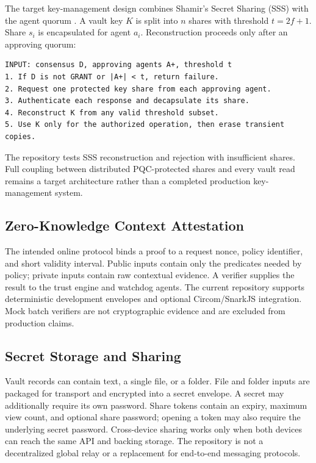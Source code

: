 \documentclass[10pt]{article}
\let\cite\citep
\begin{document}
The target key-management design combines Shamir's Secret Sharing (SSS) with the agent quorum \cite{shamir1979}. A vault key $K$ is split into $n$ shares with threshold $t=2f+1$. Share $s_i$ is encapsulated for agent $a_i$. Reconstruction proceeds only after an approving quorum:

\begin{lstlisting}[caption={Consensus-gated key reconstruction},label={alg:keyrec}]
INPUT: consensus D, approving agents A+, threshold t
1. If D is not GRANT or |A+| < t, return failure.
2. Request one protected key share from each approving agent.
3. Authenticate each response and decapsulate its share.
4. Reconstruct K from any valid threshold subset.
5. Use K only for the authorized operation, then erase transient copies.
\end{lstlisting}

The repository tests SSS reconstruction and rejection with insufficient shares. Full coupling between distributed PQC-protected shares and every vault read remains a target architecture rather than a completed production key-management system.

\subsection*{Zero-Knowledge Context Attestation}

The intended online protocol binds a proof to a request nonce, policy identifier, and short validity interval. Public inputs contain only the predicates needed by policy; private inputs contain raw contextual evidence. A verifier supplies the result to the trust engine and watchdog agents. The current repository supports deterministic development envelopes and optional Circom/SnarkJS integration. Mock batch verifiers are not cryptographic evidence and are excluded from production claims.

\subsection*{Secret Storage and Sharing}

Vault records can contain text, a single file, or a folder. File and folder inputs are packaged for transport and encrypted into a secret envelope. A secret may additionally require its own password. Share tokens contain an expiry, maximum view count, and optional share password; opening a token may also require the underlying secret password. Cross-device sharing works only when both devices can reach the same API and backing storage. The repository is not a decentralized global relay or a replacement for end-to-end messaging protocols.
\end{document}

